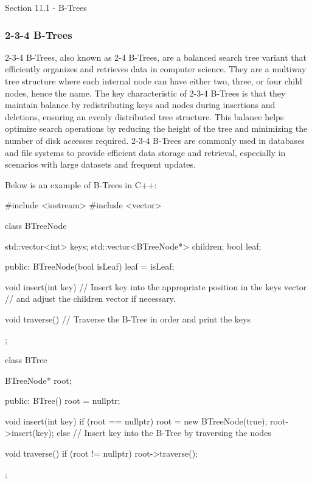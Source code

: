 \begin{notes}{Section 11.1 - B-Trees}
    \subsubsection*{2-3-4 B-Trees}
    
    2-3-4 B-Trees, also known as 2-4 B-Trees, are a balanced search tree variant that efficiently organizes and retrieves data in computer science. They are a multiway tree structure where each internal node can have either two, three, or four child nodes, hence the name. The key characteristic of 2-3-4 B-Trees is that they maintain balance by redistributing 
    keys and nodes during insertions and deletions, ensuring an evenly distributed tree structure. This balance helps optimize search operations by reducing the height of the tree and minimizing the number of disk accesses required. 2-3-4 B-Trees are commonly used in databases and file systems to provide efficient data storage and retrieval, especially 
    in scenarios with large datasets and frequent updates.
    
    \begin{highlight}
        Below is an example of B-Trees in C++:
    
    \begin{code}[C++]
    #include <iostream>
    #include <vector>
    
    class BTreeNode {
        std::vector<int> keys;
        std::vector<BTreeNode*> children;
        bool leaf;
    
    public:
        BTreeNode(bool isLeaf) {
            leaf = isLeaf;
        }
    
        void insert(int key) {
            // Insert key into the appropriate position in the keys vector
            // and adjust the children vector if necessary.
        }
    
        void traverse() {
            // Traverse the B-Tree in order and print the keys
        }
    };
    
    class BTree {
        BTreeNode* root;
    
    public:
        BTree() {
            root = nullptr;
        }
    
        void insert(int key) {
            if (root == nullptr) {
                root = new BTreeNode(true);
                root->insert(key);
            } else {
                // Insert key into the B-Tree by traversing the nodes
            }
        }
    
        void traverse() {
            if (root != nullptr) {
                root->traverse();
            }
        }
    };
    

\end{code}
\end{highlight}
\end{notes}
